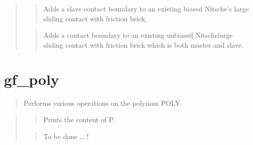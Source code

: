 \documentclass[a4paper,11pt,english]{sphinxmanual}
\begin{document}
\begin{quote}
\begin{quote}
\sphinxAtStartPar
Adds a slave contact boundary to an existing biased Nitsche’s large sliding contact
with friction brick.
\end{quote}

\sphinxAtStartPar
{}
\begin{quote}

\sphinxAtStartPar
Adds a contact boundary to an existing unbiased Nitschelarge sliding contact
with friction brick which is both master and slave.
\end{quote}
\end{quote}


\section{gf\_poly}
\label{\detokenize{matlab_octave/cmdref_gf_poly:gf-poly}}\label{\detokenize{matlab_octave/cmdref_gf_poly::doc}}
\sphinxAtStartPar
{}

\begin{sphinxVerbatim}[commandchars=\\\{\}]
  
  
\end{sphinxVerbatim}

\sphinxAtStartPar
{}
\begin{quote}

\sphinxAtStartPar
Performs various operations on the polynom POLY.
\end{quote}

\sphinxAtStartPar
{}
\begin{quote}

\sphinxAtStartPar
{}
\begin{quote}

\sphinxAtStartPar
Prints the content of P.
\end{quote}

\sphinxAtStartPar
{}
\begin{quote}

\sphinxAtStartPar
To be done … !
\end{quote}
\end{quote}
\end{document}
